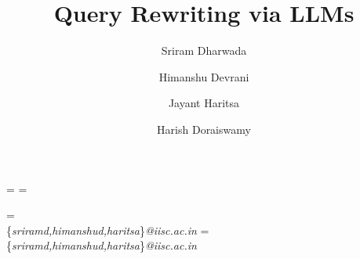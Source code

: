 \documentclass[12pt]{article}
\makeatletter
\newcommand\email[2][]%
{\newaffiltrue\let\AB@blk@and\AB@pand
	\if\relax#1\relax\def\AB@note{\AB@thenote}\else\def\AB@note{\relax}%
	\setcounter{Maxaffil}{0}\fi
	\begingroup
	\let\protect\@unexpandable@protect
	\def\thanks{\protect\thanks}\def\footnote{\protect\footnote}%
	\@temptokena=\expandafter{\AB@authors}%
	{\def\\{\protect\\\protect\Affilfont}\xdef\AB@temp{#2}}%
	\xdef\AB@authors{\the\@temptokena\AB@las\AB@au@str
		\protect\\[\affilsep]\protect\Affilfont\AB@temp}%
	\gdef\AB@las{}\gdef\AB@au@str{}%
	{\def\\{, \ignorespaces}\xdef\AB@temp{#2}}%
	\@temptokena=\expandafter{\AB@affillist}%
	\xdef\AB@affillist{\the\@temptokena \AB@affilsep
		\AB@affilnote{}\protect\Affilfont\AB@temp}%
	\endgroup
	\let\AB@affilsep\AB@affilsepx
}
\makeatother
\begin{document}
\title{Query Rewriting via LLMs}
\date{}

\author[1]{Sriram Dharwada}
\author[1]{Himanshu Devrani}
\author[1]{Jayant Haritsa}
\author[2]{Harish Doraiswamy}

\email{\{\textit{sriramd,himanshud,haritsa}\}\textit{@iisc.ac.in}}
\email{\textit{harish.doraiswamy@microsoft.com}}

\maketitle


\setcounter{page}{1}















% 
% 
\newpage
\appendix

\end{document}
